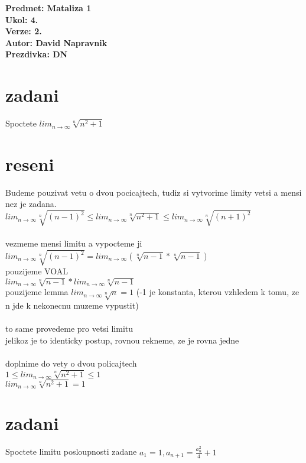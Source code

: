 \documentclass[a4paper]{article}
\def\doubleunderline#1{\underline{\underline{#1}}}
\begin{document}
\noindent
\textbf{Predmet: Mataliza 1}\\
\textbf{Ukol: 4.}\\
\textbf{Verze: 2.}\\
\textbf{Autor: David Napravnik}\\
\textbf{Prezdivka: DN}

\section*{zadani}
Spoctete $lim_{n \rightarrow \infty} \sqrt[n]{n^2 + 1}$


\section*{reseni}
Budeme pouzivat vetu o dvou pocicajtech,
tudiz si vytvorime limity vetsi a mensi nez je zadana.\\
$
lim_{n \rightarrow \infty} \sqrt[n]{(n - 1)^2} \leq
lim_{n \rightarrow \infty} \sqrt[n]{n^2 + 1} \leq
lim_{n \rightarrow \infty} \sqrt[n]{(n + 1)^2}
$\\\\
vezmeme mensi limitu a vypocteme ji\\
$lim_{n \rightarrow \infty} \sqrt[n]{(n - 1)^2} =
lim_{n \rightarrow \infty} (\sqrt[n]{n - 1} * \sqrt[n]{n - 1})$\\
pouzijeme VOAL\\
$lim_{n \rightarrow \infty} \sqrt[n]{n - 1} * lim_{n \rightarrow \infty} \sqrt[n]{n - 1}$\\
pouzijeme lemma $lim_{n \rightarrow \infty} \sqrt[n]{n}=1$
(-1 je konstanta, kterou vzhledem k tomu, ze n jde k nekonecnu muzeme vypustit)\\
\\
to same provedeme pro vetsi limitu\\
jelikoz je to identicky postup, rovnou rekneme, ze je rovna jedne\\
\\
doplnime do vety o dvou policajtech\\
$1 \leq lim_{n \rightarrow \infty} \sqrt[n]{n^2 + 1} \leq 1$\\
\doubleunderline{$lim_{n \rightarrow \infty} \sqrt[n]{n^2 + 1} = 1$}



\section*{zadani}
Spoctete limitu posloupnosti zadane 
$a_1 = 1, a_{n+1} = \frac{a^2_n}{4} + 1$
\end{document}

